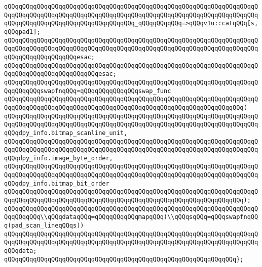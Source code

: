 \verb|qQQqqQQqqQQqqQQqqQQqqQQqqQQqqQQqqQQqqQQqqQQqqQQqqQQqqQQqqQQqqQQqqQQqqQQqqQQqqQQqqQQqqQQqqQQqqQQqqQQqqQQqqQQqqQQqqQQqqQQqqQQqqQQqqQQqqQQqqQQqqQQqqQQqqQQqqQQqqQQqqQQqqQQqqQQqqQQq_qQQqqQQqqQQq=>qQQqv1u::catqQQq[s,qQQqpad1];|\newline
\verb|qQQqqQQqqQQqqQQqqQQqqQQqqQQqqQQqqQQqqQQqqQQqqQQqqQQqqQQqqQQqqQQqqQQqqQQqqQQqqQQqqQQqqQQqqQQqqQQqqQQqqQQqqQQqqQQqqQQqqQQqqQQqqQQqqQQqqQQqqQQqqQQqqQQqqQQqqQQqqQQqesac;|\newline
\newline
\newline
\verb|qQQqqQQqqQQqqQQqqQQqqQQqqQQqqQQqqQQqqQQqqQQqqQQqqQQqqQQqqQQqqQQqqQQqqQQqqQQqqQQqqQQqqQQqqQQqqQQqesac;|\newline
\newline
\verb|qQQqqQQqqQQqqQQqqQQqqQQqqQQqqQQqqQQqqQQqqQQqqQQqqQQqqQQqqQQqqQQqqQQqqQQqqQQqqQQqswapfnqQQq=qQQqqQQqqQQqqQQqswap_func|\newline
\verb|qQQqqQQqqQQqqQQqqQQqqQQqqQQqqQQqqQQqqQQqqQQqqQQqqQQqqQQqqQQqqQQqqQQqqQQqqQQqqQQqqQQqqQQqqQQqqQQqqQQqqQQqqQQqqQQqqQQqqQQqqQQqqQQqqQQqqQQq(|\newline
\verb|qQQqqQQqqQQqqQQqqQQqqQQqqQQqqQQqqQQqqQQqqQQqqQQqqQQqqQQqqQQqqQQqqQQqqQQqqQQqqQQqqQQqqQQqqQQqqQQqqQQqqQQqqQQqqQQqqQQqqQQqqQQqqQQqqQQqqQQqqQQqqQQqdpy_info.bitmap_scanline_unit,|\newline
\verb|qQQqqQQqqQQqqQQqqQQqqQQqqQQqqQQqqQQqqQQqqQQqqQQqqQQqqQQqqQQqqQQqqQQqqQQqqQQqqQQqqQQqqQQqqQQqqQQqqQQqqQQqqQQqqQQqqQQqqQQqqQQqqQQqqQQqqQQqqQQqqQQqdpy_info.image_byte_order,|\newline
\verb|qQQqqQQqqQQqqQQqqQQqqQQqqQQqqQQqqQQqqQQqqQQqqQQqqQQqqQQqqQQqqQQqqQQqqQQqqQQqqQQqqQQqqQQqqQQqqQQqqQQqqQQqqQQqqQQqqQQqqQQqqQQqqQQqqQQqqQQqqQQqqQQqdpy_info.bitmap_bit_order|\newline
\verb|qQQqqQQqqQQqqQQqqQQqqQQqqQQqqQQqqQQqqQQqqQQqqQQqqQQqqQQqqQQqqQQqqQQqqQQqqQQqqQQqqQQqqQQqqQQqqQQqqQQqqQQqqQQqqQQqqQQqqQQqqQQqqQQqqQQqqQQq);|\newline
\newline
\verb|qQQqqQQqqQQqqQQqqQQqqQQqqQQqqQQqqQQqqQQqqQQqqQQqqQQqqQQqqQQqqQQqqQQqqQQqqQQqqQQq\\qQQqdataqQQq=qQQqqQQqqQQqmapqQQq(\\qQQqsqQQq=qQQqswapfnqQQq(pad_scan_lineqQQqs))|\newline
\verb|qQQqqQQqqQQqqQQqqQQqqQQqqQQqqQQqqQQqqQQqqQQqqQQqqQQqqQQqqQQqqQQqqQQqqQQqqQQqqQQqqQQqqQQqqQQqqQQqqQQqqQQqqQQqqQQqqQQqqQQqqQQqqQQqqQQqqQQqqQQqqQQqdata;|\newline
\verb|qQQqqQQqqQQqqQQqqQQqqQQqqQQqqQQqqQQqqQQqqQQqqQQqqQQqqQQqqQQqqQQq};|\newline
